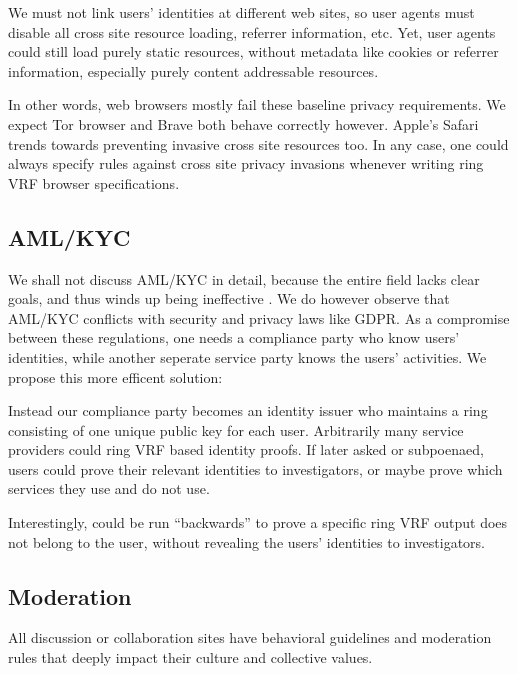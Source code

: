 We must not link users' identities at different web sites, so user agents
must disable all cross site resource loading, referrer information, etc.
Yet, user agents could still load purely static resources, without metadata
like cookies or referrer information, especially purely content addressable
resources.

In other words, web browsers mostly fail these baseline privacy requirements.
We expect Tor browser and Brave both behave correctly however.
Apple's Safari trends towards preventing invasive cross site resources too.  
In any case, one could always specify rules against cross site privacy invasions
whenever writing ring VRF browser specifications.


\subsection{AML/KYC}

We shall not discuss AML/KYC in detail, because the entire field lacks
clear goals, and thus winds up being ineffective
 \cite{doi:10.1080/25741292.2020.1725366}.
We do however observe that AML/KYC conflicts with security and privacy
laws like GDPR.  As a compromise between these regulations,
one needs a compliance party who know users' identities,
 while another seperate service party knows the users' activities.
We propose this more efficent solution:

Instead our compliance party becomes an identity issuer who maintains
a ring \ctx consisting of one unique public key for each user.
Arbitrarily many service providers could ring VRF based identity proofs.
If later asked or subpoenaed, users could prove their relevant identities
to investigators, or maybe prove which services they use and do not use. 

Interestingly, \PedVRF could be run ``backwards'' to prove a specific
ring VRF output does not belong to the user, without revealing the users'
identities to investigators. 


\subsection{Moderation}
\label{subsec:moderation}

All discussion or collaboration sites have behavioral guidelines and
moderation rules that deeply impact their culture and collective values.

